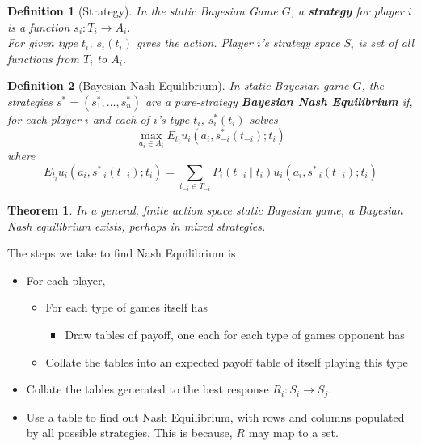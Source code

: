 \documentclass[12pt]{article}
\newtheorem{definition}{Definition}[section]
\newtheorem{theorem}{Theorem}[section]
\theoremstyle{definition}
\begin{document}
\begin{definition}[Strategy]
\normalfont In the static Bayesian Game $G$, a \textbf{strategy} for player $i$ is a function $s_i: T_i\to A_i$.\\
For given type $t_i$, $s_i(t_i)$ gives the action. Player $i$'s strategy space $S_i$ is set of all functions from $T_i$ to $A_i$.
\end{definition}
\begin{definition}[Bayesian Nash Equilibrium]
\normalfont In static Bayesian game $G$, the strategies $s^\ast = (s_1^\ast, \ldots, s_n^\ast)$ are a pure-strategy \textbf{Bayesian Nash Equilibrium} if, for each player $i$ and each of $i$'s type $t_i$, $s_i^\ast(t_i)$ solves
\[
\max_{a_i\in A_i} E_{t_i} u_i(a_i, s_{-i}^\ast(t_{-i}); t_i)
\]
where 
\[
E_{t_i} u_i(a_i, s_{-i}^\ast(t_{-i}); t_i) = \sum_{t_{-i}\in T_{-i}} P_i(t_{-i}\mid t_i)u_i(a_i, s_{-i}^\ast(t_{-i}); t_i)
\]
\end{definition}
\begin{theorem}\normalfont In a general, finite action space static Bayesian game, a Bayesian Nash equilibrium exists, perhaps in mixed strategies.\end{theorem}
The steps we take to find Nash Equilibrium is 
\begin{itemize}
  \item For each player,
  \begin{itemize}
    \item For each type of games itself has
    \begin{itemize}
      \item Draw tables of payoff, one each for each type of games opponent has
    \end{itemize}
    \item Collate the tables into an expected payoff table of itself playing this type
  \end{itemize}
  \item Collate the tables generated to the best response $R_i: S_i\to S_j$.
  \item Use a table to find out Nash Equilibrium, with rows and columns populated by all possible strategies. This is because, $R$ may map to a set.
\end{itemize}
\end{document}
